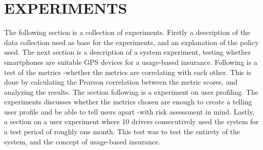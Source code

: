 \section{EXPERIMENTS}\label{sec:experiments}

The following section is a collection of experiments. Firstly a description of the data collection used as base for the experiments, and an explanation of the policy used. The next section is a description of a system experiment, testing whether smartphones are suitable GPS devices for a usage-based insurance. Following is a test of the metrics -whether the metrics are correlating with each other. This is done by calculating the Pearson correlation between the metric scores, and analyzing the results. The section following is a experiment on user profiling. The experiments discusses whether the metrics chosen are enough to create a telling user profile and be able to tell users apart -with risk assessment in mind. Lastly, a section on a user experiment where 10 drivers consecutively used the system for a test period of roughly one month. This test was to test the entirety of the system, and the concept of usage-based insurance.




